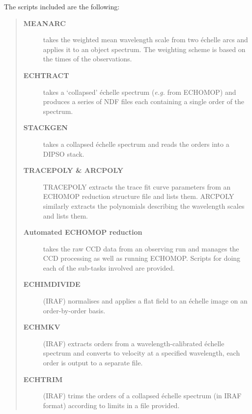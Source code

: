 \documentclass[twoside,11pt]{article}
\newcommand{\htmlref}[2]{#1}
\newcommand{\xref}[3]{#1}
\renewcommand{\_}{\texttt{\symbol{95}}}
\begin{document}
The scripts included are the following:

\begin{quote}
\begin{description}

\item [\htmlref{{\bf MEANARC }}{se_meanarc}]
      takes the weighted mean wavelength scale from
      two \'{e}chelle arcs and applies it to an object spectrum.
      The weighting scheme is based on the times of the observations.

\item [\htmlref{{\bf ECHTRACT}}{se_echtract}]
      takes a `collapsed' \'{e}chelle spectrum ({\it{e.g.}}
      from ECHOMOP) and produces a series of NDF files each
      containing a single order of the spectrum.

\item [\htmlref{{\bf STACKGEN}}{se_stackgen}]
      takes a collapsed \'{e}chelle spectrum and reads
      the orders into a \xref{DIPSO}{sun50}{} stack.

\item [\htmlref{{\bf TRACEPOLY \& ARCPOLY}}{se_tracepoly}]
      TRACEPOLY extracts the trace fit curve parameters from an ECHOMOP
      reduction structure file and lists them.
      ARCPOLY similarly extracts the polynomials describing the
      wavelength scales and lists them.

\item [\htmlref{{\bf Automated ECHOMOP reduction}}{se_automated_echomop}]
      takes the raw CCD data from an
      observing run and manages the CCD processing as well as running
      ECHOMOP\@.  Scripts for doing each of the sub-tasks involved
      are provided.

\item [\htmlref{{\bf ECHIMDIVIDE}}{se_echimdivide}]
      (IRAF) normalises and applies a flat field to an \'{e}chelle
      image on an order-by-order basis.

\item [\htmlref{{\bf ECHMKV}}{se_echmkv}]
      (IRAF) extracts orders from a wavelength-calibrated
      \'{e}chelle spectrum and converts to velocity at a specified
      wavelength, each order is output to a separate file.

\item [\htmlref{{\bf ECHTRIM}}{se_echtrim}]
      (IRAF) trims the orders of a collapsed \'{e}chelle
      spectrum (in IRAF format) according to limits in a file provided.

\end{description}
\end{quote}
\end{document}
